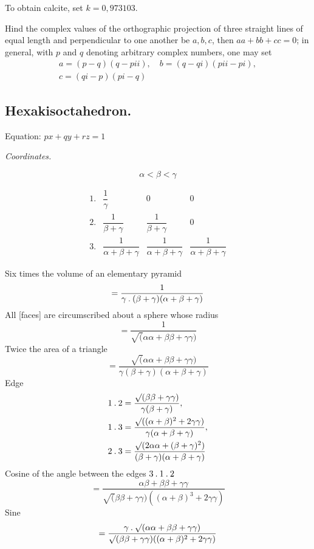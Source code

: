 To obtain calcite, set $k=0{,}973103$.

Hind the complex values of the orthographic projection of three straight lines of equal length and perpendicular to one another be $a,b,c$, then $aa+bb+cc=0$; in general, with $p$ and $q$ denoting arbitrary complex numbers, one may set
\[
\begin{gathered}
a=(p-q)(q-pii),\quad b=(q-qi)(pii-pi),\\c=(qi-p)(pi-q)
\end{gathered}
\]

\clearpage
{}
\subsection*{Hexakisoctahedron.}
\begin{center}
\resizebox{!}{14mm}{}\qquad Equation: $px+qy+rz=1$
\end{center}

\begin{center}\emph{Coordinates.}\end{center}
\begin{center}
\begin{minipage}{.28\textwidth}\centering
\resizebox{\linewidth}{!}{}
\[\alpha<\beta<\gamma\]
\end{minipage}\hfill
\begin{minipage}{.68\textwidth}
\[
\begin{array}{rccc}
1.&\dfrac1\gamma&0&0\\[1ex]
2.&\dfrac1{\beta+\gamma}&\dfrac1{\beta+\gamma}&0\\[1ex]
3.&\dfrac1{\alpha+\beta+\gamma}&\dfrac1{\alpha+\beta+\gamma}&\dfrac1{\alpha+\beta+\gamma}
\end{array}
\]
\end{minipage}
\end{center}

Six times the volume of an elementary pyramid
\[
=\frac1{\gamma\mathbin{.}(\beta+\gamma)(\alpha+\beta+\gamma)}
\]
All [faces] are circumscribed about a sphere whose radius
\[
=\frac1{\surd(\alpha\alpha+\beta\beta+\gamma\gamma)}
\]
Twice the area of a triangle
\[
=\frac{\surd(\alpha\alpha+\beta\beta+\gamma\gamma)}{\gamma(\beta+\gamma)(\alpha+\beta+\gamma)}
\]
Edge
\[
\begin{aligned}
1\mathbin{.}2&=\frac{\surd(\beta\beta+\gamma\gamma)}{\gamma(\beta+\gamma)},\\
1\mathbin{.}3&=\frac{\surd((\alpha+\beta)^2+2\gamma\gamma)}{\gamma(\alpha+\beta+\gamma)},\\
2\mathbin{.}3&=\frac{\surd(2\alpha\alpha+(\beta+\gamma)^2)}{(\beta+\gamma)(\alpha+\beta+\gamma)}
\end{aligned}
\]
Cosine of the angle between the edges $3\mathbin{.}1\mathbin{.}2$
\[
=\frac{\alpha\beta+\beta\beta+\gamma\gamma}{\surd(\beta\beta+\gamma\gamma)((\alpha+\beta)^3+2\gamma\gamma)}
\]
Sine
\[
=\frac{\gamma\mathbin{.}\surd(\alpha\alpha+\beta\beta+\gamma\gamma)}{\surd(\beta\beta+\gamma\gamma)((\alpha+\beta)^2+2\gamma\gamma)}
\]

